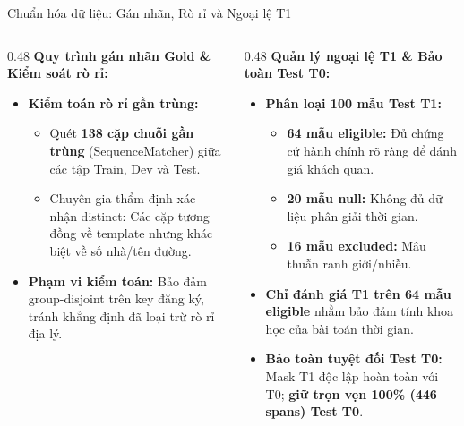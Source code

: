 \documentclass[aspectratio=169, 9pt]{beamer}
\begin{document}
\begin{frame}{Chuẩn hóa dữ liệu: Gán nhãn, Rò rỉ và Ngoại lệ T1}
  \vspace{-0.15cm}
  {\fontsize{8.2pt}{10.5pt}\selectfont
  \begin{columns}[T]
    \begin{column}{0.48\textwidth}
      \textbf{Quy trình gán nhãn Gold \& Kiểm soát rò rỉ:}
      \begin{itemize}
        \setlength{\itemsep}{3pt}
        \item \textbf{Kiểm toán rò rỉ gần trùng:}
        \begin{itemize}
          \setlength{\itemsep}{1.5pt}
          \item Quét \textbf{138 cặp chuỗi gần trùng} (SequenceMatcher) giữa các tập Train, Dev và Test.
          \item Chuyên gia thẩm định xác nhận distinct: Các cặp tương đồng về template nhưng khác biệt về số nhà/tên đường.
        \end{itemize}
        \item \textbf{Phạm vi kiểm toán:} Bảo đảm group-disjoint trên key đăng ký, tránh khẳng định đã loại trừ rò rỉ địa lý.
      \end{itemize}
    \end{column}
    \begin{column}{0.48\textwidth}
      \textbf{Quản lý ngoại lệ T1 \& Bảo toàn Test T0:}
      \begin{itemize}
        \setlength{\itemsep}{3pt}
        \item \textbf{Phân loại 100 mẫu Test T1:}
        \begin{itemize}
          \setlength{\itemsep}{1.5pt}
          \item \textbf{64 mẫu eligible:} Đủ chứng cứ hành chính rõ ràng để đánh giá khách quan.
          \item \textbf{20 mẫu null:} Không đủ dữ liệu phân giải thời gian.
          \item \textbf{16 mẫu excluded:} Mâu thuẫn ranh giới/nhiễu.
        \end{itemize}
        \item \textbf{Chỉ đánh giá T1 trên 64 mẫu eligible} nhằm bảo đảm tính khoa học của bài toán thời gian.
        \item \textbf{Bảo toàn tuyệt đối Test T0:} Mask T1 độc lập hoàn toàn với T0; \textbf{giữ trọn vẹn 100\% (446 spans) Test T0}.
      \end{itemize}
    \end{column}
  \end{columns}
  }
\end{frame}
\end{document}
